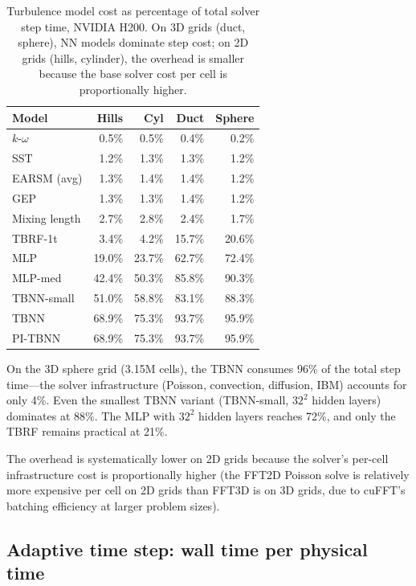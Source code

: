 \begin{table}[htbp]
\centering
\caption{Turbulence model cost as percentage of total solver step time, NVIDIA H200. On 3D grids (duct, sphere), NN models dominate step cost; on 2D grids (hills, cylinder), the overhead is smaller because the base solver cost per cell is proportionally higher.}
\label{tab:overhead}
\begin{tabular}{lrrrr}
\toprule
Model & Hills & Cyl & Duct & Sphere \\
\midrule
$k$-$\omega$ & 0.5\% & 0.5\% & 0.4\% & 0.2\% \\
SST & 1.2\% & 1.3\% & 1.3\% & 1.2\% \\
EARSM (avg) & 1.3\% & 1.4\% & 1.4\% & 1.2\% \\
GEP & 1.3\% & 1.3\% & 1.4\% & 1.2\% \\
Mixing length & 2.7\% & 2.8\% & 2.4\% & 1.7\% \\
\midrule
TBRF-1t & 3.4\% & 4.2\% & 15.7\% & 20.6\% \\
MLP & 19.0\% & 23.7\% & 62.7\% & 72.4\% \\
MLP-med & 42.4\% & 50.3\% & 85.8\% & 90.3\% \\
TBNN-small & 51.0\% & 58.8\% & 83.1\% & 88.3\% \\
TBNN & 68.9\% & 75.3\% & 93.7\% & 95.9\% \\
PI-TBNN & 68.9\% & 75.3\% & 93.7\% & 95.9\% \\
\bottomrule
\end{tabular}
\end{table}

On the 3D sphere grid (3.15M cells), the TBNN consumes 96\% of the total step time---the solver infrastructure (Poisson, convection, diffusion, IBM) accounts for only 4\%.
Even the smallest TBNN variant (TBNN-small, $32^2$ hidden layers) dominates at 88\%.
The MLP with $32^2$ hidden layers reaches 72\%, and only the TBRF remains practical at 21\%.

The overhead is systematically lower on 2D grids because the solver's per-cell infrastructure cost is proportionally higher (the FFT2D Poisson solve is relatively more expensive per cell on 2D grids than FFT3D is on 3D grids, due to cuFFT's batching efficiency at larger problem sizes).

\subsection{Adaptive time step: wall time per physical time}
\label{sec:cost:adaptive}

